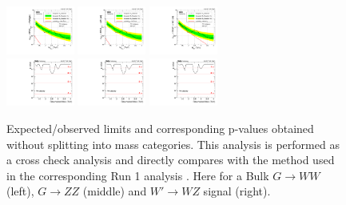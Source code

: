\begin{figure}[h!]
\centering
\includegraphics[width=0.20\textwidth]{figures/analysis/search1/AN-15-211/limits/brazilianFlag_BulkWW_old_combined_13TeV_wPDF.pdf}
\includegraphics[width=0.20\textwidth]{figures/analysis/search1/AN-15-211/limits/brazilianFlag_BulkZZ_old_combined_13TeV_wPDF.pdf}
\includegraphics[width=0.20\textwidth]{figures/analysis/search1/AN-15-211/limits/brazilianFlag_WZ_old_combined_13TeV_wPDF.pdf}\\
\includegraphics[width=0.20\textwidth]{figures/analysis/search1/AN-15-211/pvalues/pvalue_BulkWWin_combined_old.pdf}
\includegraphics[width=0.20\textwidth]{figures/analysis/search1/AN-15-211/pvalues/pvalue_BulkZZin_combined_old.pdf}
\includegraphics[width=0.20\textwidth]{figures/analysis/search1/AN-15-211/pvalues/pvalue_WZin_combined_old.pdf}

\caption{Expected/observed limits and corresponding p-values obtained without splitting into mass categories. This analysis is performed as a cross check analysis and directly compares with the method used in the corresponding Run 1 analysis \cite{CMS-PAS-EXO-14-024}.  Here for a Bulk $G\rightarrow WW$ (left), $G\rightarrow ZZ$ (middle) and $W'\rightarrow WZ$ signal (right).}
\label{fig:searchI:Limits_CombOld}
\end{figure}
\clearpage

